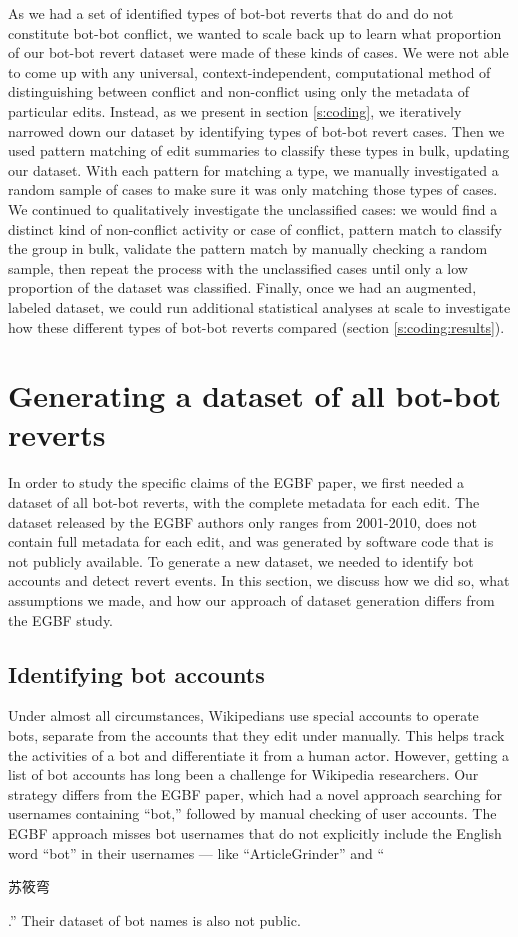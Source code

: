 \documentclass[format=acmsmall, review=false, screen=true]{acmart}%
\begin{document}
As we had a set of identified types of bot-bot reverts that do and do not constitute bot-bot conflict, we wanted to scale back up to learn what proportion of our bot-bot revert dataset were made of these kinds of cases. We were not able to come up with any universal, context-independent, computational method of distinguishing between conflict and non-conflict using only the metadata of particular edits. Instead, as we present in section \ref{s:coding}, we iteratively narrowed down our dataset by identifying types of bot-bot revert cases. Then we used pattern matching of edit summaries to classify these types in bulk, updating our dataset. With each pattern for matching a type, we manually investigated a random sample of cases to make sure it was only matching those types of cases. We continued to qualitatively investigate the unclassified cases: we would find a distinct kind of non-conflict activity or case of conflict, pattern match to classify the group in bulk, validate the pattern match by manually checking a random sample, then repeat the process with the unclassified cases until only a low proportion of the dataset was classified. Finally, once we had an augmented, labeled dataset, we could run additional statistical analyses at scale to investigate how these different types of bot-bot reverts compared (section \ref{s:coding:results}).

\section{Generating a dataset of all bot-bot reverts} \label{s:dataset}
In order to study the specific claims of the EGBF paper, we first needed a dataset of all bot-bot reverts, with the complete metadata for each edit. The dataset released by the EGBF authors only ranges from 2001-2010, does not contain full metadata for each edit, and was generated by software code that is not publicly available. To generate a new dataset, we needed to identify bot accounts and detect revert events. In this section, we discuss how we did so, what assumptions we made, and how our approach of dataset generation differs from the EGBF study.



\subsection{Identifying bot accounts}
Under almost all circumstances, Wikipedians use special accounts to operate bots, separate from the accounts that they edit under manually. This helps track the activities of a bot and differentiate it from a human actor. However, getting a list of bot accounts has long been a challenge for Wikipedia researchers. Our strategy differs from the EGBF paper, which had a novel approach searching for usernames containing ``bot,'' followed by manual checking of user accounts. The EGBF approach misses bot usernames that do not explicitly include the English word ``bot'' in their usernames --- like ``ArticleGrinder'' and ``\begin{CJK}{UTF8}{gbsn}苏筱弯\end{CJK}.'' Their dataset of bot names is also not public.
\end{document}
